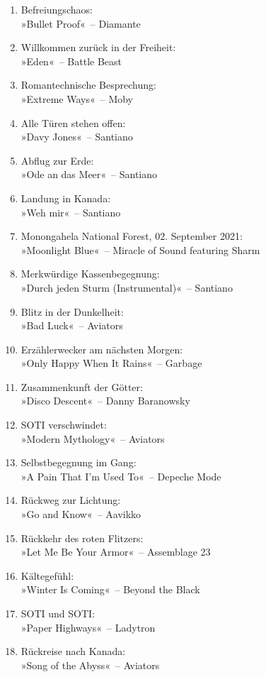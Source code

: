 \begin{enumerate}
    \item Befreiungschaos:\\ »Bullet Proof«~– Diamante
    \item Willkommen zurück in der Freiheit:\\ »Eden«~– Battle Beast
    \item Romantechnische Besprechung:\\ »Extreme Ways«~– Moby
    \item Alle Türen stehen offen:\\ »Davy Jones«~– Santiano
    \item Abflug zur Erde:\\ »Ode an das Meer«~– Santiano
    \item Landung in Kanada:\\ »Weh mir«~– Santiano
    \item Monongahela National Forest, 02. September 2021:\\ »Moonlight Blue«~– Miracle of Sound featuring Sharm
    \item Merkwürdige Kassenbegegnung:\\ »Durch jeden Sturm (Instrumental)«~– Santiano
    \item Blitz in der Dunkelheit:\\ »Bad Luck«~– Aviators
    \item Erzählerwecker am nächsten Morgen:\\ »Only Happy When It Rains«~– Garbage
    \item Zusammenkunft der Götter:\\ »Disco Descent«~– Danny Baranowsky
    \item SOTI verschwindet:\\ »Modern Mythology«~– Aviators
    \item Selbstbegegnung im Gang:\\ »A Pain That I’m Used To«~– Depeche Mode
    \item Rückweg zur Lichtung:\\ »Go and Know«~– Aavikko
    \item Rückkehr des roten Flitzers:\\ »Let Me Be Your Armor«~– Assemblage 23
    \item Kältegefühl:\\ »Winter Is Coming«~– Beyond the Black
    \item SOTI und SOTI:\\ »Paper Highways«~– Ladytron
    \item Rückreise nach Kanada:\\ »Song of the Abyss«~– Aviators

\end{enumerate}
